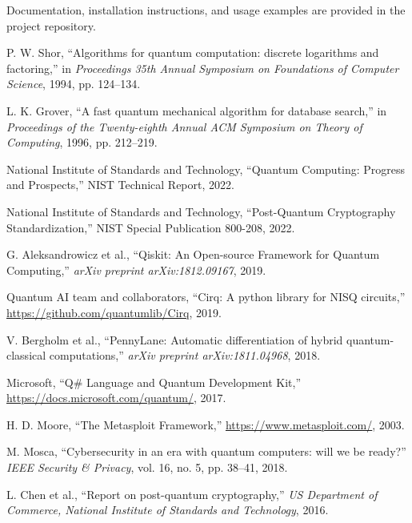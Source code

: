 \documentclass[11pt]{article}
\begin{document}
Documentation, installation instructions, and usage examples are provided in the project repository.


\begin{thebibliography}{99}

P. W. Shor,
``Algorithms for quantum computation: discrete logarithms and factoring,''
in \emph{Proceedings 35th Annual Symposium on Foundations of Computer Science}, 1994, pp. 124--134.

L. K. Grover,
``A fast quantum mechanical algorithm for database search,''
in \emph{Proceedings of the Twenty-eighth Annual ACM Symposium on Theory of Computing}, 1996, pp. 212--219.

National Institute of Standards and Technology,
``Quantum Computing: Progress and Prospects,''
NIST Technical Report, 2022.

National Institute of Standards and Technology,
``Post-Quantum Cryptography Standardization,''
NIST Special Publication 800-208, 2022.

G. Aleksandrowicz et al.,
``Qiskit: An Open-source Framework for Quantum Computing,''
\emph{arXiv preprint arXiv:1812.09167}, 2019.

Quantum AI team and collaborators,
``Cirq: A python library for NISQ circuits,''
\url{https://github.com/quantumlib/Cirq}, 2019.

V. Bergholm et al.,
``PennyLane: Automatic differentiation of hybrid quantum-classical computations,''
\emph{arXiv preprint arXiv:1811.04968}, 2018.

Microsoft,
``Q\# Language and Quantum Development Kit,''
\url{https://docs.microsoft.com/quantum/}, 2017.

H. D. Moore,
``The Metasploit Framework,''
\url{https://www.metasploit.com/}, 2003.

M. Mosca,
``Cybersecurity in an era with quantum computers: will we be ready?''
\emph{IEEE Security \& Privacy}, vol. 16, no. 5, pp. 38--41, 2018.

L. Chen et al.,
``Report on post-quantum cryptography,''
\emph{US Department of Commerce, National Institute of Standards and Technology}, 2016.

\end{thebibliography}
\end{document}

